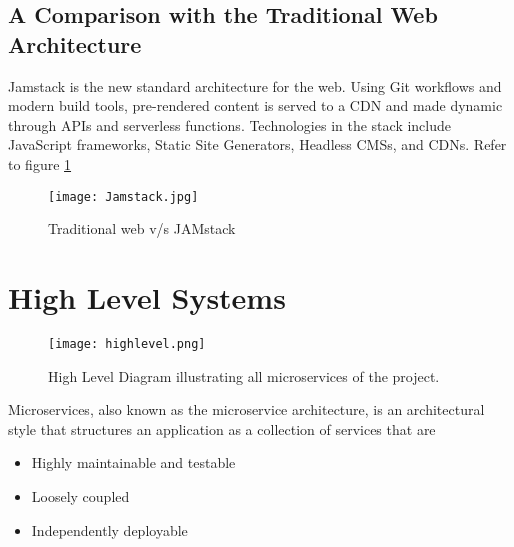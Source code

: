 \subsection{A Comparison with  the Traditional Web Architecture}

Jamstack is the new standard architecture for the web. Using Git workflows and modern build tools, pre-rendered content 
is served to a CDN and made dynamic through APIs and serverless functions. Technologies in the stack include JavaScript frameworks, 
Static Site Generators, Headless CMSs, and CDNs. Refer to figure \ref{fig:jamstack}

\begin{figure}[h!]
    \begin{center}
        \texttt{[image: Jamstack.jpg]}
    \end{center}
    \caption{Traditional web v/s JAMstack}
    \label{fig:jamstack}
\end{figure}

\section{High Level Systems}

\begin{figure}[h]
    \centering
    \texttt{[image: highlevel.png]}
    \caption{High Level Diagram illustrating all microservices of the project.}
    \label{fig:highlevel}
\end{figure}

Microservices, also known as the microservice architecture, is an architectural style that structures an 
application as a collection of services that are
\begin{itemize}
    \item Highly maintainable and testable
    \item Loosely coupled
    \item Independently deployable
\end{itemize}

